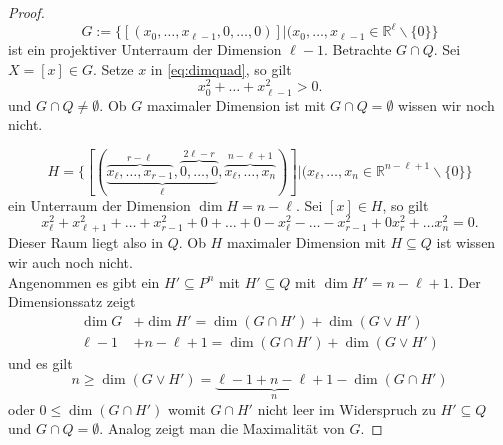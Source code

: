 \documentclass[11pt]{article}
\begin{document}
\begin{proof}
\begin{equation*}
    G:= \{[(x_0,\dots, x_{\ell-1}, 0,\dots,0)]|(x_0,\dots, x_{\ell-1}\in \mathbb R^{\ell}\backslash\{0\}\}
\end{equation*} ist ein projektiver Unterraum der Dimension $\ell-1$. Betrachte $G\cap Q$. Sei $X= [x]\in G$. Setze $x$ in \eqref{eq:dimquad}, so gilt 
\begin{equation*}
     x_0^2 + \dots + x_{\ell-1}^2 > 0.
\end{equation*} und $G\cap Q\neq \emptyset$. Ob $G$ maximaler Dimension ist mit $G\cap Q = \emptyset$ wissen wir noch nicht.

\begin{equation*}
    H= \{[(\underbrace{\overbrace{x_\ell,\dots, x_{r-1}}^{r-\ell},\overbrace{ 0 ,\dots, 0}^{2\ell-r}}_{\ell}, \overbrace{x_\ell,\dots, x_n}^{n-\ell +1})]| (x_\ell, \dots, x_n\in \mathbb R^{n-\ell+1}\backslash \{0\}\}
\end{equation*} ein Unterraum der Dimension $\dim H = n-\ell$. Sei $[x]\in H$, so gilt \begin{equation*}
    x_\ell^2 + x_{\ell+1}^2 + \dots + x_{r-1}^2 + 0 + \dots  + 0 - x_\ell^2 - \dots - x_{r-1}^2 + 0 x_r^2 + \dots x_n^2 = 0.
\end{equation*}
Dieser Raum liegt also in $Q$. Ob $H$ maximaler Dimension mit $H\subseteq Q$ ist wissen wir auch noch nicht.\\
Angenommen es gibt ein $H'\subseteq P^n$ mit $H'\subseteq Q$ mit $\dim H' = n-\ell + 1$. Der Dimensionssatz zeigt \begin{equation*}
\begin{split}
    \dim G &+ \dim H' = \dim (G\cap H') + \dim (G\lor H')\\
    \ell-1 &+n-\ell + 1  =  \dim (G\cap H') + \dim (G\lor H')
\end{split}
\end{equation*}
 und es gilt \begin{equation*}
     n\geq \dim(G\lor H') = \underbrace{\ell-1+n-\ell + 1}_n - \dim(G\cap H')
 \end{equation*}
 oder $0\leq \dim(G\cap H')$ womit $G\cap H'$ nicht leer im Widerspruch zu $H'\subseteq Q$ und $G\cap Q = \emptyset$. Analog zeigt man die Maximalität von $G$.
\end{proof}
\end{document}
